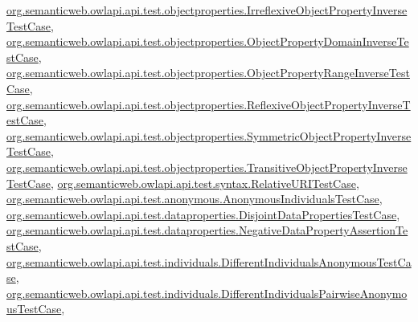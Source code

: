 \hyperlink{classorg_1_1semanticweb_1_1owlapi_1_1api_1_1test_1_1objectproperties_1_1_irreflexive_object_property_inverse_test_case_a848ac3d3f6e7efb941f3ff6217778e12}{org.\-semanticweb.\-owlapi.\-api.\-test.\-objectproperties.\-Irreflexive\-Object\-Property\-Inverse\-Test\-Case}, \hyperlink{classorg_1_1semanticweb_1_1owlapi_1_1api_1_1test_1_1objectproperties_1_1_object_property_domain_inverse_test_case_a05dc90c8e653c12294c05991c8fa8095}{org.\-semanticweb.\-owlapi.\-api.\-test.\-objectproperties.\-Object\-Property\-Domain\-Inverse\-Test\-Case}, \hyperlink{classorg_1_1semanticweb_1_1owlapi_1_1api_1_1test_1_1objectproperties_1_1_object_property_range_inverse_test_case_a9bd69dd9e68b5b098b8b3630913e91e9}{org.\-semanticweb.\-owlapi.\-api.\-test.\-objectproperties.\-Object\-Property\-Range\-Inverse\-Test\-Case}, \hyperlink{classorg_1_1semanticweb_1_1owlapi_1_1api_1_1test_1_1objectproperties_1_1_reflexive_object_property_inverse_test_case_a2135dfccf33d7f80ef8ba783e5f0a907}{org.\-semanticweb.\-owlapi.\-api.\-test.\-objectproperties.\-Reflexive\-Object\-Property\-Inverse\-Test\-Case}, \hyperlink{classorg_1_1semanticweb_1_1owlapi_1_1api_1_1test_1_1objectproperties_1_1_symmetric_object_property_inverse_test_case_aac79df622683e78fe74f69ad36ff2d5a}{org.\-semanticweb.\-owlapi.\-api.\-test.\-objectproperties.\-Symmetric\-Object\-Property\-Inverse\-Test\-Case}, \hyperlink{classorg_1_1semanticweb_1_1owlapi_1_1api_1_1test_1_1objectproperties_1_1_transitive_object_property_inverse_test_case_ad6f4e8d69ef9a66f1581695502613748}{org.\-semanticweb.\-owlapi.\-api.\-test.\-objectproperties.\-Transitive\-Object\-Property\-Inverse\-Test\-Case}, \hyperlink{classorg_1_1semanticweb_1_1owlapi_1_1api_1_1test_1_1syntax_1_1_relative_u_r_i_test_case_a37b380a50f6240667f5c243647014b8c}{org.\-semanticweb.\-owlapi.\-api.\-test.\-syntax.\-Relative\-U\-R\-I\-Test\-Case}, \hyperlink{classorg_1_1semanticweb_1_1owlapi_1_1api_1_1test_1_1anonymous_1_1_anonymous_individuals_test_case_a45afce79f45a62be5a8905575d06a0b0}{org.\-semanticweb.\-owlapi.\-api.\-test.\-anonymous.\-Anonymous\-Individuals\-Test\-Case}, \hyperlink{classorg_1_1semanticweb_1_1owlapi_1_1api_1_1test_1_1dataproperties_1_1_disjoint_data_properties_test_case_aea68ef6494bd6fbba1a19aaaffab6b14}{org.\-semanticweb.\-owlapi.\-api.\-test.\-dataproperties.\-Disjoint\-Data\-Properties\-Test\-Case}, \hyperlink{classorg_1_1semanticweb_1_1owlapi_1_1api_1_1test_1_1dataproperties_1_1_negative_data_property_assertion_test_case_aa1da3f4e0acf31bdd4445346482ae73c}{org.\-semanticweb.\-owlapi.\-api.\-test.\-dataproperties.\-Negative\-Data\-Property\-Assertion\-Test\-Case}, \hyperlink{classorg_1_1semanticweb_1_1owlapi_1_1api_1_1test_1_1individuals_1_1_different_individuals_anonymous_test_case_aacec2765d6a5d3f7acfeb583e482a004}{org.\-semanticweb.\-owlapi.\-api.\-test.\-individuals.\-Different\-Individuals\-Anonymous\-Test\-Case}, \hyperlink{classorg_1_1semanticweb_1_1owlapi_1_1api_1_1test_1_1individuals_1_1_different_individuals_pairwise_anonymous_test_case_a8a27f1b6df66a4355b222afe10f17418}{org.\-semanticweb.\-owlapi.\-api.\-test.\-individuals.\-Different\-Individuals\-Pairwise\-Anonymous\-Test\-Case}, 